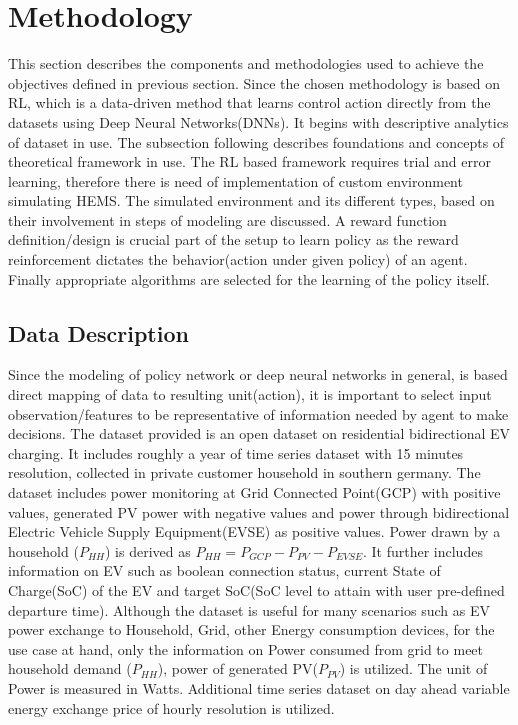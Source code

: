 
\chapter{Methodology} \label{ch-2}

\begin{large}
	
This section describes the components and methodologies used to achieve the objectives defined in previous section. Since the chosen methodology is based on RL, which is a data-driven method that learns control action directly from the datasets using Deep Neural Networks(DNNs). It begins with descriptive analytics of dataset in use. The subsection following describes foundations and concepts of theoretical framework in use. The RL based framework requires trial and error learning, therefore there is need of implementation of custom environment simulating HEMS. The simulated environment and its different types, based on their involvement in steps of modeling are discussed. A reward function definition/design is crucial part of the setup to learn policy as the reward reinforcement dictates the behavior(action under given policy) of an agent. Finally appropriate algorithms are selected for the learning of the policy itself. \\ 


\section{Data Description}

Since the modeling of policy network or deep neural networks in general, is based direct mapping of data to resulting unit(action), it is important to select input observation/features to be representative of information needed by agent to make decisions. The dataset \cite{dataset} provided is an open dataset on residential bidirectional EV charging. It includes roughly a year of time series dataset with 15 minutes resolution, collected in private customer household in southern germany. The dataset includes power monitoring at Grid Connected Point(GCP) with positive values, generated PV power with negative values and power through bidirectional Electric Vehicle Supply Equipment(EVSE) as positive values. Power drawn by a household ($P_{HH}$) is derived as $P_{HH}=P_{GCP}-P_{PV}-P_{EVSE}$. It further includes information on EV such as boolean connection status, current State of Charge(SoC) of the EV and target SoC(SoC level to attain with user pre-defined departure time). Although the dataset is useful for many scenarios such as EV power exchange to Household, Grid, other Energy consumption devices, for the use case at hand, only the information on Power consumed from grid to meet household demand ($P_{HH}$), power of generated PV($P_{PV}$) is utilized. The unit of Power is measured in Watts. Additional time series dataset\cite{energychartsinfo} on day ahead variable energy exchange price of hourly resolution is utilized. \\


\end{large}
